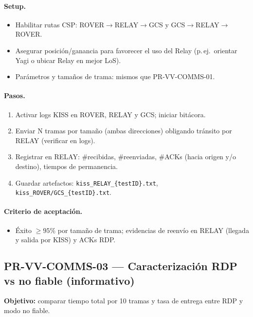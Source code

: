 \paragraph{Setup.}
\begin{itemize}
  \item Habilitar rutas CSP: ROVER$\rightarrow$RELAY$\rightarrow$GCS y GCS$\rightarrow$RELAY$\rightarrow$ROVER.
  \item Asegurar posición/ganancia para favorecer el uso del Relay (p.\,ej.\ orientar Yagi o ubicar Relay en mejor LoS).
  \item Parámetros y tamaños de trama: mismos que PR-VV-COMMS-01.
\end{itemize}

\paragraph{Pasos.}
\begin{enumerate}
  \item Activar logs KISS en ROVER, RELAY y GCS; iniciar bitácora.
  \item Enviar N tramas por tamaño (ambas direcciones) obligando tránsito por RELAY (verificar en logs).
  \item Registrar en RELAY: \#recibidas, \#reenviadas, \#ACKs (hacia origen y/o destino), tiempos de permanencia.
  \item Guardar artefactos: \texttt{kiss\_RELAY\_\{testID\}.txt}, \texttt{kiss\_ROVER/GCS\_\{testID\}.txt}.
\end{enumerate}

\paragraph{Criterio de aceptación.}
\begin{itemize}
  \item Éxito $\ge 95\%$ por tamaño de trama; evidencias de reenvío en RELAY (llegada y salida por KISS) y ACKs RDP.
\end{itemize}

\subsection*{PR-VV-COMMS-03 — Caracterización RDP vs no fiable (informativo)}
\textbf{Objetivo:} comparar tiempo total por 10 tramas y tasa de entrega entre RDP y modo no fiable.


